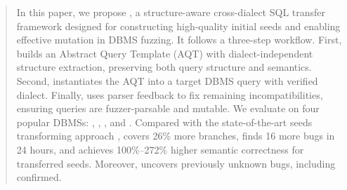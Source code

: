 \documentclass[sigconf,review,anonymous]{acmart}
\begin{document}
\begin{abstract}
In this paper, we propose \tool{}, a structure-aware cross-dialect SQL transfer framework designed for constructing high-quality initial seeds and enabling effective mutation in DBMS fuzzing. 
It follows a three-step workflow.
First, \tool{} builds an Abstract Query Template (AQT) with dialect-independent structure extraction, preserving both query structure and semantics.
Second, \tool{} instantiates the AQT into a target DBMS query with verified dialect.
Finally, \tool{} uses parser feedback to fix remaining incompatibilities, ensuring queries are fuzzer-parsable and mutable.
We evaluate \tool{} on four popular DBMSs: \duckdb{}, \clickhouse{}, \monetdb{}, and \virtuoso{}. 
Compared with the state-of-the-art seeds transforming approach \sedar{}, \tool{} covers 26\% more branches, finds 16 more bugs in 24 hours, and achieves 100\%–272\% higher semantic correctness for transferred seeds.
Moreover, \tool{} uncovers \bugcnt{} previously unknown bugs, including \bugconfirmcnt{} confirmed.





\end{abstract}
\end{document}
